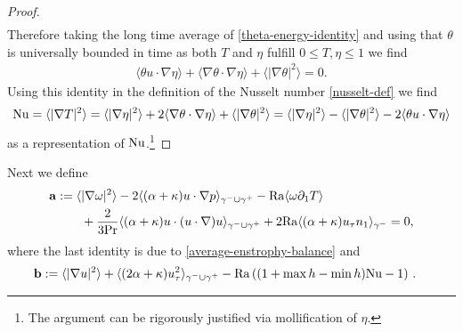 \documentclass{article}
\theoremstyle{definition}
\theoremstyle{definition}
\newcommand{\Pra}{\rm{Pr}}
\newcommand{\Ra}{{\rm{Ra}}}
\newcommand{\Nu}{{\rm{Nu}}}
\begin{document}
\begin{proof}
\begin{align*}
\end{align*}
Therefore taking the long time average of \eqref{theta-energy-identity} and using that $\theta$ is universally bounded in time as both $T$ and $\eta$ fulfill $0\leq T,\eta\leq 1$ we find
\begin{align*}
    \langle \theta u\cdot\nabla \eta \rangle + \langle \nabla\theta \cdot \nabla \eta \rangle + \langle |\nabla\theta|^2\rangle = 0.
\end{align*}
Using this identity in the definition of the Nusselt number \eqref{nusselt-def} we find
\begin{align*}
    \Nu = \langle|\nabla T|^2 \rangle = \langle |\nabla \eta|^2\rangle + 2\langle \nabla \theta \cdot\nabla\eta \rangle + \langle |\nabla \theta|^2\rangle = \langle |\nabla \eta|^2\rangle - \langle |\nabla \theta|^2\rangle -2\langle \theta u \cdot\nabla\eta \rangle
\end{align*}
as a representation of $\Nu$.\footnote{The argument can be rigorously justified via mollification of $\eta$.}
\end{proof}
%
Next we define
\begin{equation*}
    \label{def-a}
    \begin{aligned}
        \mathbf{a} &:= \langle |\nabla \omega|^2\rangle -2 \langle (\alpha+\kappa)u\cdot\nabla p\rangle_{\gamma^-\cup\gamma^+} - \Ra \langle \omega\partial_1 T\rangle 
        \\
        &\qquad + \frac{2}{3\Pra} \langle (\alpha+\kappa) u\cdot (u\cdot\nabla) u\rangle_{\gamma^-\cup\gamma^+} + 2\Ra \langle (\alpha+\kappa) u_\tau n_1\rangle_{\gamma^-} =0,
    \end{aligned}
\end{equation*}
where the last identity is due to \eqref{average-enstrophy-balance} and 
\begin{align}
    \label{def-b}
    \mathbf{b} &:= \langle|\nabla u|^2\rangle + \langle (2\alpha+\kappa) u_\tau^2\rangle_{\gamma^-\cup \gamma^+} - \Ra\left((1+\max h - \min h) \Nu-1\right)\,.%
\end{align}
\end{document}
